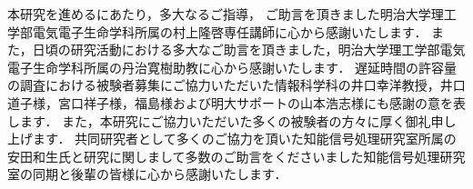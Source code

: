 \begin{acknowledgement}
本研究を進めるにあたり，多大なるご指導，
ご助言を頂きました明治大学理工学部電気電子生命学科所属の村上隆啓専任講師に心から感謝いたします．
また，日頃の研究活動における多大なご助言を頂きました，明治大学理工学部電気電子生命学科所属の丹治寛樹助教に心から感謝いたします．
遅延時間の許容量の調査における被験者募集にご協力いただいた情報科学科の井口幸洋教授，井口道子様，宮口祥子様，福島様および明大サポートの山本浩志様にも感謝の意を表します．
また，本研究にご協力いただいた多くの被験者の方々に厚く御礼申し上げます．
共同研究者として多くのご協力を頂いた知能信号処理研究室所属の安田和生氏と研究に関しまして多数のご助言をくださいました知能信号処理研究室の同期と後輩の皆様に心から感謝いたします．
\makesignature
\end{acknowledgement}
